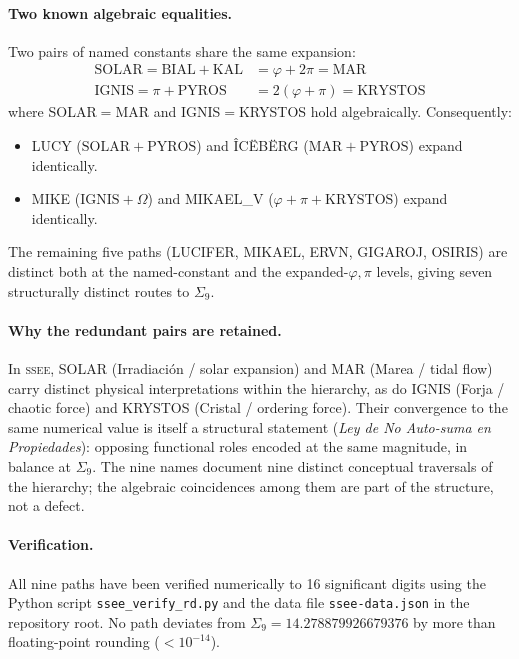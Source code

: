 \documentclass[12pt,a4paper]{article}
\newcommand{\SSEE}{\ifmmode\mathrm{SSEE}\else\textsc{ssee}\fi}
\begin{document}
\paragraph{Two known algebraic equalities.}
Two pairs of named constants share the same expansion:
\begin{align}
\mathrm{SOLAR} = \mathrm{BIAL}+\mathrm{KAL} &= \varphi+2\pi = \mathrm{MAR} \\
\mathrm{IGNIS} = \pi+\mathrm{PYROS} &= 2(\varphi+\pi) = \mathrm{KRYSTOS}
\end{align}
where SOLAR$=$MAR and IGNIS$=$KRYSTOS hold algebraically.
Consequently:
\begin{itemize}
  \item LUCY ($\mathrm{SOLAR}+\mathrm{PYROS}$) and \^{I}C\"{E}B\"{E}RG
        ($\mathrm{MAR}+\mathrm{PYROS}$) expand identically.
  \item MIKE ($\mathrm{IGNIS}+\Omega$) and MIKAEL\_V ($\varphi+\pi+\mathrm{KRYSTOS}$)
        expand identically.
\end{itemize}
The remaining five paths (LUCIFER, MIKAEL, ERVN, GIGAROJ, OSIRIS) are
distinct both at the named-constant and the expanded-$\varphi,\pi$ levels,
giving seven structurally distinct routes to $\Sigma_9$.

\paragraph{Why the redundant pairs are retained.}
In \SSEE, SOLAR (Irradiación / solar expansion) and MAR (Marea / tidal flow)
carry distinct physical interpretations within the hierarchy, as do IGNIS
(Forja / chaotic force) and KRYSTOS (Cristal / ordering force).
Their convergence to the same numerical value is itself a structural statement
(\emph{Ley de No Auto-suma en Propiedades}): opposing functional roles encoded
at the same magnitude, in balance at $\Sigma_9$.
The nine names document nine distinct conceptual traversals of the hierarchy;
the algebraic coincidences among them are part of the structure, not a defect.

\paragraph{Verification.}
All nine paths have been verified numerically to 16 significant digits using
the Python script \texttt{ssee\_verify\_rd.py} and the data file
\texttt{ssee-data.json} in the repository root.
No path deviates from $\Sigma_9 = 14.278879926679376$ by more than floating-point
rounding ($<10^{-14}$).



\end{document}

